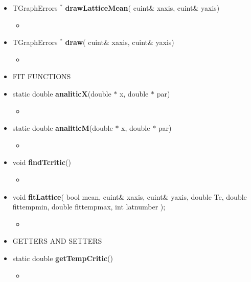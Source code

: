 \begin{itemize}
\begin{itemize}
  \item[] TGraphErrors ${}^*$ \textbf{drawLatticeMean}(
    cuint\& x\textunderscore axis,
    cuint\& y\textunderscore axis)
    \begin{itemize}
    \item[]
    \end{itemize}

  \item[] TGraphErrors ${}^*$ \textbf{draw}(
    cuint\& x\textunderscore axis,
    cuint\& y\textunderscore axis)
    \begin{itemize}
    \item[]
    \end{itemize}


  \item[] FIT FUNCTIONS \\

  \item[] static double \textbf{analiticX}(double $*$ x, double $*$ par)
    \begin{itemize}
    \item[]
    \end{itemize}

  \item[] static double \textbf{analiticM}(double $*$ x, double $*$ par)
    \begin{itemize}
    \item[]
    \end{itemize}

  \item[] void \textbf{findTcritic}()
    \begin{itemize}
    \item[]
    \end{itemize}

  \item[] void \textbf{fitLattice}( bool mean,
    cuint\& x\textunderscore axis,
    cuint\& y\textunderscore axis,
    double Tc,
    double fit\textunderscore temp\textunderscore min,
    double fit\textunderscore temp\textunderscore max,
    int lat\textunderscore number
    );
    \begin{itemize}
    \item[]
    \end{itemize}

    \newpage

  \item[]       GETTERS AND SETTERS \\

  \item[] static double \textbf{getTempCritic}()
    \begin{itemize}
    \item[]
    \end{itemize}


\end{itemize}
\end{itemize}

